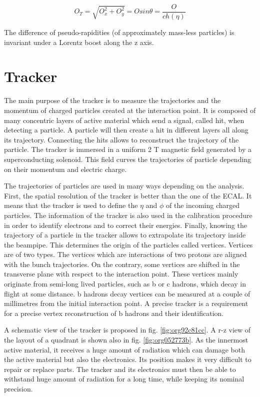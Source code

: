 \begin{equation}
\label{eq:org28a33c2}
O_T = \sqrt{O_x^2+O^2_y} = Osin\theta = \frac{O}{ch(\eta)}
\end{equation}

The difference of pseudo-rapidities (of approximately mass-less particles) is invariant under a Lorentz boost along the z axis.

\section{Tracker}
\label{sec:org62e1a18}

\label{sec:Detector_tracker}
The main purpose of the tracker is to measure the trajectories and the momentum of charged particles created at the interaction point.
It is composed of many concentric layers of active material which send a signal, called hit, when detecting a particle.
A particle will then create a hit in different layers all along its trajectory.
Connecting the hits allows to reconstruct the trajectory of the particle.
The tracker is immersed in  a uniform 2 T magnetic field generated by a superconducting solenoid.
This field curves the trajectories of particle depending on their momentum and electric charge.

The trajectories of particles are used in many ways depending on the analysis.
First, the spatial resolution of the tracker is better than the one of the ECAL.
It means that the tracker is used to define the $\eta$ and $\phi$ of the incoming charged particles.
The information of the tracker is also used in the calibration procedure in order to identify electrons and to correct their energies.
Finally, knowing the trajectory of a particle in the tracker allows to extrapolate its trajectory inside the beampipe.
This determines the origin of the particles called vertices.
Vertices are of two types.
The vertices which are interactions of two protons are aligned with the bunch trajectories.
On the contrary, some vertices are shifted in the transverse plane with respect to the interaction point.
These vertices mainly originate from semi-long lived particles, such as b or c hadrons, which decay in flight at some distance.
b hadrons decay vertices can be measured at a couple of millimetres from the initial interaction point.
A precise tracker is a requirement for a precise vertex reconstruction of b hadrons and their identification.

A schematic view of the tracker is proposed in fig. \ref{fig:org92c81cc}.
A r-z view of the layout of a quadrant is shown also in fig. \ref{fig:org052773b}.
As the innermost active material, it receives a huge amount of radiation which can damage both the active material but also the electronics.
Its position makes it very difficult to repair or replace parts.
The tracker and its electronics must then be able to withstand huge amount of radiation for a long time, while keeping its nominal precision.

